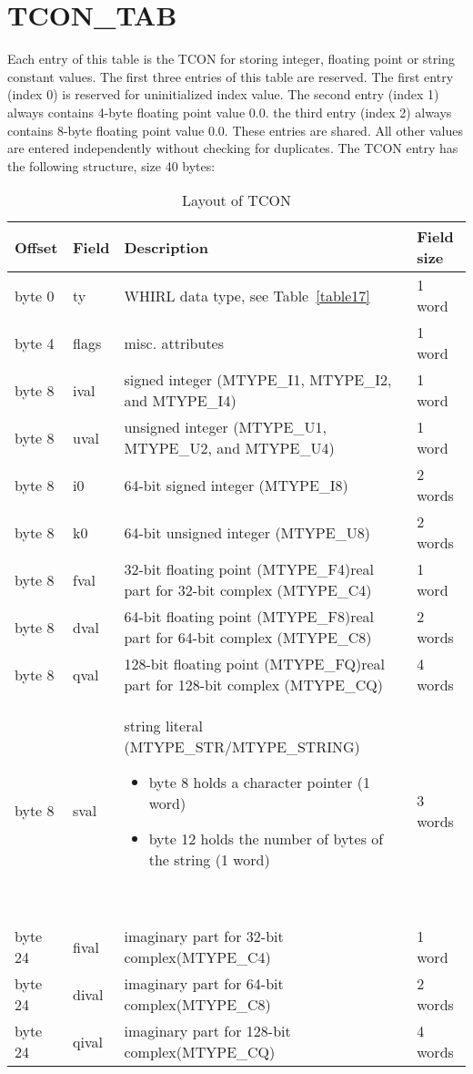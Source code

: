 \section{TCON\_TAB}

Each entry of this table is the
%
TCON for storing integer, floating
point or string constant values. The first three entries of this table
are reserved. The first entry (index 0) is reserved for uninitialized
index value. The second entry (index 1) always contains 4-byte
floating point value 0.0. the third entry (index 2) always contains
8-byte floating point value 0.0. These entries are shared. All other
values are entered independently without checking for duplicates. The
%
TCON entry has the following structure, size 40 bytes:

\begin{table}[h]
\centering
\caption{Layout of TCON} 
\label{table26} 
\begin{tabular}{|l|l|p{3in}|l|}\hline
Offset & Field & Description & Field size\\\hline\hline
byte 0 & ty & WHIRL data type, see Table~\ref{table17} & 1 word \\\hline
byte 4 & flags & misc. attributes & 1 word \\\hline
byte 8 & ival & signed integer (MTYPE\_I1, MTYPE\_I2, and MTYPE\_I4) & 1 word\\\hline
byte 8 & uval & unsigned integer (MTYPE\_U1, MTYPE\_U2, and MTYPE\_U4) & 1 word\\\hline
byte 8 & i0 & 64-bit signed integer (MTYPE\_I8) & 2 words \\\hline
byte 8 & k0 & 64-bit unsigned integer (MTYPE\_U8) & 2 words \\\hline
byte 8 & fval & 32-bit floating point (MTYPE\_F4)real part for 32-bit complex (MTYPE\_C4) & 1 word\\\hline
byte 8 & dval & 64-bit floating point (MTYPE\_F8)real part for 64-bit complex (MTYPE\_C8) & 2 words\\\hline
byte 8 & qval & 128-bit floating point (MTYPE\_FQ)real part for 128-bit
 complex (MTYPE\_CQ) & 4 words\\\hline
byte 8 & sval & 
\begin{minipage}{3in}
string literal (MTYPE\_STR/MTYPE\_STRING)
\begin{itemize}
\item byte 8  holds a character pointer  (1 word)
\item byte 12  holds the number of bytes of the string  (1 word)
\end{itemize}
~
\end{minipage} & 3 words \\\hline
byte 24 & fival & imaginary part for 32-bit complex(MTYPE\_C4) & 1 word\\\hline
byte 24 & dival & imaginary part for 64-bit complex(MTYPE\_C8) & 2 words\\\hline

byte 24 & qival & imaginary part for 128-bit complex(MTYPE\_CQ)&  4 words\\\hline
\end{tabular}
\end{table}

